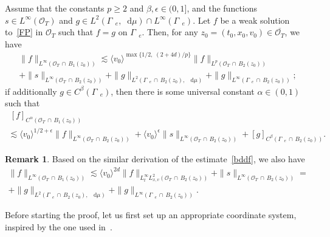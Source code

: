 \documentclass[10pt]{amsart}
\theoremstyle{definition}\newtheorem{defi}[theo]{Definition}\newtheorem{rema}[theo]{Remark}\newtheorem{exam}[theo]{Example}\newtheorem{exem}[theo]{Example}\newtheorem{nota}[theo]{Notation}
\newcommand*{\dif}{\mathop{}\!\mathrm{d}}
\newcommand*\Ge {\Gamma_{\;\!\!\;\!\!e}}
\newcommand*\OO {\mathcal{O}}
\newcommand{\lvv}{\langle v_0\rangle}
\begin{document}
\begin{prop}\label{local}
Assume that the constants $p\ge2$ and $\beta,\epsilon\in(0,1]$, and the functions $s\in L^\infty(\OO_T)$ and $g\in L^2(\Ge,\dif\mu)\cap L^\infty(\Ge)$. Let $f$ be a weak solution to~\eqref{FP} in $\OO_T$ such that $f=g$ on $\Ge$. Then, for any $z_0=(t_0,x_0,v_0)\in\overline{\OO_T}$, we have
\begin{multline}\label{bddf}
\|f\|_{L^\infty\left(\OO_T\,\cap\,B_1(z_0)\right)}
\lesssim
\lvv^{\max\{1/2,\;\!(2+4d)/p\}}\|f\|_{L^p\left(\OO_T\,\cap \,B_2(z_0)\right)}\\
+\|s\|_{L^\infty\left(\OO_T\,\cap\,B_2(z_0)\right)} 
+\|g\|_{L^2\left(\Ge\,\cap\,B_2(z_0),\;\!\dif\mu\right)} +\|g\|_{L^\infty\left(\Ge\,\cap\,B_2(z_0)\right)};
\end{multline}
if additionally $g\in C^\beta(\Ge)$, then there is some universal constant $\alpha\in(0,1)$ such that
\begin{multline}\label{holderf}
\ [f]_{C^\alpha\left(\OO_T\,\cap\,B_{1}(z_0)\right)}\\
\lesssim
\lvv^{1/2+\epsilon}\|f\|_{L^\infty\left(\OO_T\,\cap \,B_2(z_0)\right)} 
+\lvv^{\epsilon}\|s\|_{L^\infty\left(\OO_T\,\cap\,B_2(z_0)\right)} + [g]_{C^\beta\left(\Ge\,\cap\,B_{2}(z_0)\right)}.
\end{multline}
\end{prop}

\begin{rema}\label{localremark}
Based on the similar derivation of the estimate~\eqref{bddf}, we also have
\begin{multline*}
\|f\|_{L^\infty\left(\OO_T\,\cap\,B_1(z_0)\right)}
\lesssim \lvv^{2d}\|f\|_{L_t^\infty L_{x,v}^2\left(\OO_T\,\cap\,B_2(z_0)\right)} +\|s\|_{L^\infty\left(\OO_T\,\cap \,B_2(z_0)\right)} =\\
+\|g\|_{L^2\left(\Ge\,\cap\,B_2(z_0),\;\!\dif\mu\right)} +\|g\|_{L^\infty\left(\Ge\,\cap\,B_2(z_0)\right)}.
\end{multline*}
\end{rema}

Before starting the proof, let us first set up an appropriate coordinate system, inspired by the one used in~\cite{GHJO}.
\end{document}
